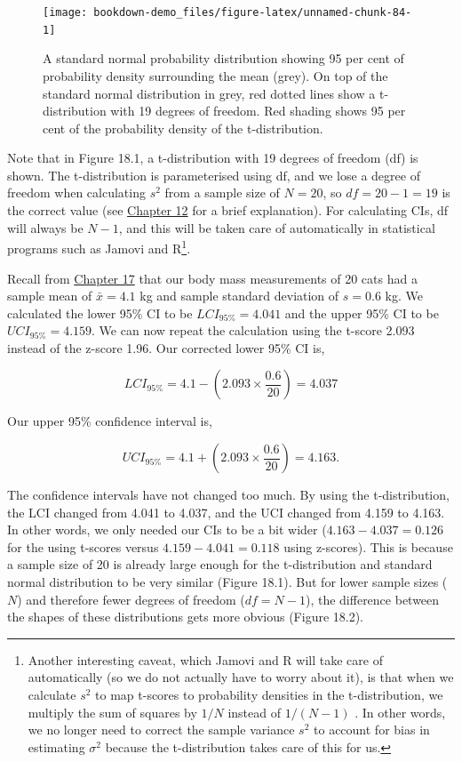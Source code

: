\documentclass[
]{scrbook}
\begin{document}
\begin{figure}
\texttt{[image: bookdown-demo\_files/figure-latex/unnamed-chunk-84-1]} \caption{A standard normal probability distribution showing 95 per cent of probability density surrounding the mean (grey). On top of the standard normal distribution in grey, red dotted lines show a t-distribution with 19 degrees of freedom. Red shading shows 95 per cent of the probability density of the t-distribution.}\label{fig:unnamed-chunk-84}
\end{figure}

Note that in Figure 18.1, a t-distribution with 19 degrees of freedom (df) is shown.
The t-distribution is parameterised using df, and we lose a degree of freedom when calculating \(s^{2}\) from a sample size of \(N = 20\), so \(df = 20 - 1 = 19\) is the correct value (see \protect\hyperlink{Chapter_12}{Chapter 12} for a brief explanation).
For calculating CIs, df will always be \(N - 1\), and this will be taken care of automatically in statistical programs such as Jamovi and R\footnote{Another interesting caveat, which Jamovi and R will take care of automatically (so we do not actually have to worry about it), is that when we calculate \(s^{2}\) to map t-scores to probability densities in the t-distribution, we multiply the sum of squares by \(1/N\) instead of \(1/(N-1)\) \citep{Sokal1995}. In other words, we no longer need to correct the sample variance \(s^{2}\) to account for bias in estimating \(\sigma^{2}\) because the t-distribution takes care of this for us.}.

Recall from \protect\hyperlink{Chapter_17}{Chapter 17} that our body mass measurements of 20 cats had a sample mean of \(\bar{x} = 4.1\) kg and sample standard deviation of \(s = 0.6\) kg. We calculated the lower 95\% CI to be \(LCI_{95\%} = 4.041\) and the upper 95\% CI to be \(UCI_{95\%} = 4.159\). We can now repeat the calculation using the t-score 2.093 instead of the z-score 1.96.
Our corrected lower 95\% CI is,

\[LCI_{95\%} = 4.1 - \left(2.093 \times \frac{0.6}{20}\right) = 4.037\]

Our upper 95\% confidence interval is,

\[UCI_{95\%} = 4.1 + \left(2.093 \times \frac{0.6}{20}\right) = 4.163.\]

The confidence intervals have not changed too much.
By using the t-distribution, the LCI changed from 4.041 to 4.037, and the UCI changed from 4.159 to 4.163.
In other words, we only needed our CIs to be a bit wider (\(4.163 - 4.037 = 0.126\) for the using t-scores versus \(4.159-4.041 = 0.118\) using z-scores).
This is because a sample size of 20 is already large enough for the t-distribution and standard normal distribution to be very similar (Figure 18.1).
But for lower sample sizes (\(N\)) and therefore fewer degrees of freedom (\(df = N - 1\)), the difference between the shapes of these distributions gets more obvious (Figure 18.2).
\end{document}
